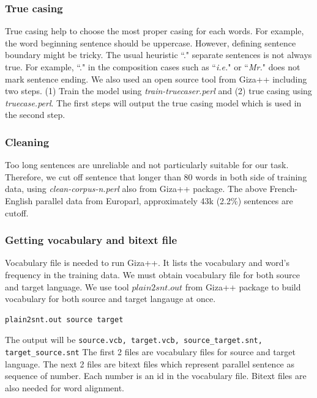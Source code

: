 \subsubsection{True casing}
True casing help to choose the most proper casing for each words. For example, the word beginning sentence should be uppercase. However, defining sentence boundary might be tricky. The usual heuristic ``." separate sentences is not always true. For example, ``." in the composition cases such as ``\textit{i.e.}" or ``\textit{Mr.}" does not mark sentence ending.
We also used an open source tool from Giza++ including two steps. (1) Train the model using \emph{train-truecaser.perl}   and (2) true casing using \emph{truecase.perl}. The first steps will output the true casing model which is used in the second step. 


\subsubsection{Cleaning}
Too long sentences are unreliable and not particularly suitable for our task. Therefore, we cut off sentence that longer than 80 words in both side of training data, using \emph{clean-corpus-n.perl} also from Giza++ package.  
The above French-English parallel data from Europarl, approximately 43k (2.2\%) sentences are cutoff. 

\subsubsection{Getting vocabulary and bitext file}
Vocabulary file is needed to run Giza++. It lists the vocabulary and word's frequency in the training data. We must obtain vocabulary file for both source and target language. We use tool $plain2snt.out$ from Giza++ package to build vocabulary for both source and target langauge at once. 
\begin{verbatim}
plain2snt.out source target
\end{verbatim}
The output will be \texttt{source.vcb, target.vcb, source_target.snt, target_source.snt} The first 2 files are vocabulary files for source and target language. The next 2 files are bitext files which represent parallel sentence as  sequence of number. Each number is an id in the vocabulary file. Bitext files are also needed for word alignment. 


